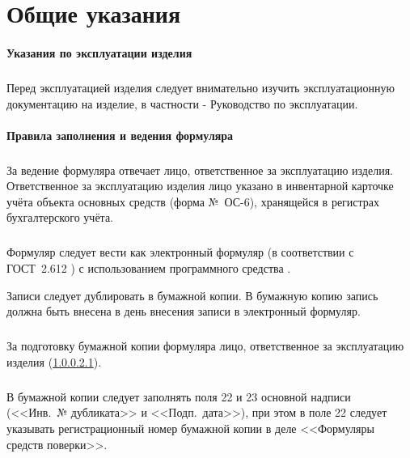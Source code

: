 \documentclass[twoside,pointsection]{gost2.105}
\begin{document}
	\maketitle
	\tableofcontents
	

	\section{Общие указания}
	
	\paragraph{Указания по эксплуатации изделия}
	
	\subparagraph{} Перед эксплуатацией изделия следует внимательно изучить
	эксплуатационную документацию на изделие, в частности - Руководство по эксплуатации.
	
	\paragraph{Правила заполнения и ведения формуляра}

	\subparagraph{}\label{МОЛ} За ведение формуляра отвечает лицо, ответственное за эксплуатацию изделия.
	Ответственное за эксплуатацию изделия лицо указано в
	инвентарной карточке учёта объекта основных средств (форма №~ОС-6),
	хранящейся в регистрах бухгалтерского учёта.
	
	\subparagraph{} Формуляр следует вести как электронный формуляр (в соответствии с ГОСТ~2.612%
	) с использованием программного средства \ais.
	\done{}
	
	Записи следует дублировать в бумажной копии. В бумажную копию запись должна быть внесена
	в день внесения записи в электронный формуляр.
	
	\subparagraph{} За подготовку бумажной копии формуляра лицо, ответственное за эксплуатацию изделия (\ref{МОЛ}).
	
	\subparagraph{} В бумажной копии следует заполнять поля 22 и 23 основной надписи (<<Инв.~№ дубликата>> и <<Подп.~дата>>), при этом в поле 22 следует указывать регистрационный номер бумажной копии в деле <<Формуляры средств поверки>>.
	
\end{document}
